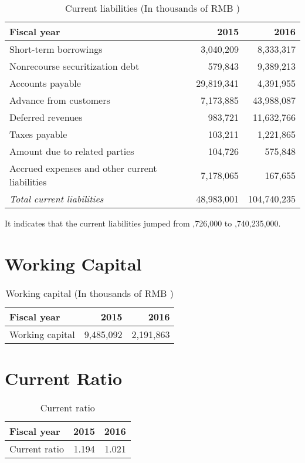 \begin{table}[H]	
	\begin{center}
		\begin{tabular}{lrr}
			\toprule
			\textbf{Fiscal year}&\textbf{2015}&\textbf{2016}\\
			\midrule
			Short-term borrowings&3,040,209&8,333,317\\
			Nonrecourse securitization debt&579,843&9,389,213\\
			Accounts payable&29,819,341&4,391,955\\
			Advance from customers&7,173,885&43,988,087\\
			Deferred revenues&983,721&11,632,766\\
			Taxes payable&103,211&1,221,865\\
			Amount due to related parties&104,726&575,848\\
			Accrued expenses and other current liabilities&7,178,065&167,655\\
			\qquad\emph{Total current liabilities}&48,983,001&104,740,235\\
			\bottomrule
		\end{tabular}
	\end{center}
	\caption{Current liabilities (In thousands of RMB \textyen)}\label{table:1}
\end{table}

It indicates that the current liabilities jumped from ,726,000 to ,740,235,000.
	
\section{Working Capital}
\begin{table}[H]	
	\begin{center}
		\begin{tabular}{lrr}
			\toprule
			\textbf{Fiscal year}&\textbf{2015}&\textbf{2016}\\
			\midrule
			Working capital&9,485,092&2,191,863\\
			\bottomrule
		\end{tabular}
	\end{center}
	\caption{Working capital (In thousands of RMB \textyen)}\label{table:1}
\end{table}


\section{Current Ratio}
\begin{table}[H]	
	\begin{center}
		\begin{tabular}{lrr}
			\toprule
			\textbf{Fiscal year}&\textbf{2015}&\textbf{2016}\\
			\midrule
			Current ratio&1.194&1.021\\
			\bottomrule
		\end{tabular}
	\end{center}
	\caption{Current ratio}\label{table:1}
\end{table}


